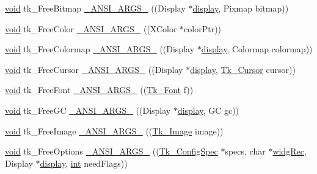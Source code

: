 \begin{DoxyCompactItemize}
\item 
\hyperlink{tk_8h_aba408b7cd755a96426e004c015f5de8e}{void} tk\+\_\+\+Free\+Bitmap \hyperlink{struct_tk_stubs_a9264137f068100d18d0d4c79ef631406}{\+\_\+\+A\+N\+S\+I\+\_\+\+A\+R\+G\+S\+\_\+} ((Display $\ast$\hyperlink{tk_8h_afc08b650bd5c7e58f8133cc830a2ef84}{display}, Pixmap bitmap))
\item 
\hyperlink{tk_8h_aba408b7cd755a96426e004c015f5de8e}{void} tk\+\_\+\+Free\+Color \hyperlink{struct_tk_stubs_a9e2ea7e38b04625b1b0bfff1e9eadb62}{\+\_\+\+A\+N\+S\+I\+\_\+\+A\+R\+G\+S\+\_\+} ((X\+Color $\ast$color\+Ptr))
\item 
\hyperlink{tk_8h_aba408b7cd755a96426e004c015f5de8e}{void} tk\+\_\+\+Free\+Colormap \hyperlink{struct_tk_stubs_a5a02ca887481709d795330e50ce645d2}{\+\_\+\+A\+N\+S\+I\+\_\+\+A\+R\+G\+S\+\_\+} ((Display $\ast$\hyperlink{tk_8h_afc08b650bd5c7e58f8133cc830a2ef84}{display}, Colormap colormap))
\item 
\hyperlink{tk_8h_aba408b7cd755a96426e004c015f5de8e}{void} tk\+\_\+\+Free\+Cursor \hyperlink{struct_tk_stubs_ace8bd8a42f94c0b0b89111c6979801dc}{\+\_\+\+A\+N\+S\+I\+\_\+\+A\+R\+G\+S\+\_\+} ((Display $\ast$\hyperlink{tk_8h_afc08b650bd5c7e58f8133cc830a2ef84}{display}, \hyperlink{tk_8h_a9505b763a290e218b96e0e83fc275691}{Tk\+\_\+\+Cursor} cursor))
\item 
\hyperlink{tk_8h_aba408b7cd755a96426e004c015f5de8e}{void} tk\+\_\+\+Free\+Font \hyperlink{struct_tk_stubs_ab3e3280e439ce0dee1e449f8e7ae73b1}{\+\_\+\+A\+N\+S\+I\+\_\+\+A\+R\+G\+S\+\_\+} ((\hyperlink{tk_8h_a9fc14938fbad69507d71d60fe79e26f6}{Tk\+\_\+\+Font} f))
\item 
\hyperlink{tk_8h_aba408b7cd755a96426e004c015f5de8e}{void} tk\+\_\+\+Free\+GC \hyperlink{struct_tk_stubs_ab3ade2b1ce9b59a3ecce44a3e26c6777}{\+\_\+\+A\+N\+S\+I\+\_\+\+A\+R\+G\+S\+\_\+} ((Display $\ast$\hyperlink{tk_8h_afc08b650bd5c7e58f8133cc830a2ef84}{display}, GC gc))
\item 
\hyperlink{tk_8h_aba408b7cd755a96426e004c015f5de8e}{void} tk\+\_\+\+Free\+Image \hyperlink{struct_tk_stubs_a2002928fa6019d8e58203a46b03cba0c}{\+\_\+\+A\+N\+S\+I\+\_\+\+A\+R\+G\+S\+\_\+} ((\hyperlink{tk_8h_af60ba3faf35d89dcf5c785d1a055e3e6}{Tk\+\_\+\+Image} image))
\item 
\hyperlink{tk_8h_aba408b7cd755a96426e004c015f5de8e}{void} tk\+\_\+\+Free\+Options \hyperlink{struct_tk_stubs_a057681ae1aa725b23dae78ccda509a09}{\+\_\+\+A\+N\+S\+I\+\_\+\+A\+R\+G\+S\+\_\+} ((\hyperlink{struct_tk___config_spec}{Tk\+\_\+\+Config\+Spec} $\ast$specs, char $\ast$\hyperlink{tk_8h_afd6092a0b5521b8d68bf11fab880cf9d}{widg\+Rec}, Display $\ast$\hyperlink{tk_8h_afc08b650bd5c7e58f8133cc830a2ef84}{display}, \hyperlink{tk_8h_a83f82f76e7fed06f4c49d2db94028a6d}{int} need\+Flags))

\end{DoxyCompactItemize}
